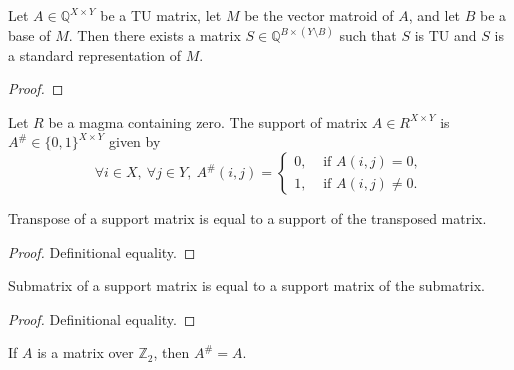 \begin{lemma}
    \label{VectorMatroid.exists_standardRepr_isBase_isTotallyUnimodular}
    \leanok
    Let $A \in \mathbb{Q}^{X \times Y}$ be a TU matrix, let $M$ be the vector matroid of $A$, and let $B$ be a base of $M$. Then there exists a matrix $S \in \mathbb{Q}^{B \times (Y \setminus B)}$ such that $S$ is TU and $S$ is a standard representation of $M$.
\end{lemma}

\begin{proof}
    \leanok
    \SeeLean
\end{proof}


\begin{definition}
    \label{Matrix.support}
    \leanok
    Let $R$ be a magma containing zero. The support of matrix $A \in R^{X \times Y}$ is $A^{\#} \in \{0, 1\}^{X \times Y}$ given by
    \[
        \forall i \in X, \ \forall j \in Y, \ A^{\#} (i, j) = \begin{cases}
            0, & \text{ if } A (i, j) = 0, \\
            1, & \text{ if } A (i, j) \neq 0.
        \end{cases}
    \]
\end{definition}

\begin{lemma}
    \label{Matrix.support_transpose}
    \leanok
    Transpose of a support matrix is equal to a support of the transposed matrix.
\end{lemma}

\begin{proof}
    \leanok
    Definitional equality.
\end{proof}

\begin{lemma}
    \label{Matrix.support_submatrix}
    \leanok
    Submatrix of a support matrix is equal to a support matrix of the submatrix.
\end{lemma}

\begin{proof}
    \leanok
    Definitional equality.
\end{proof}

\begin{lemma}
    \label{Matrix.support_Z2}
    \leanok
    If $A$ is a matrix over $\mathbb{Z}_{2}$, then $A^{\#} = A$.
\end{lemma}

